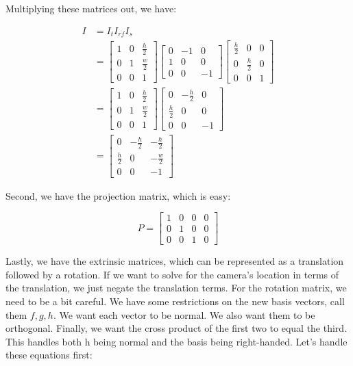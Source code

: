 \documentclass{article}
\begin{document}
Multiplying these matrices out, we have:

\begin{align}
I &= I_t I_{rf} I_s \\
  &= \begin{bmatrix}
1 & 0 & \frac{h}{2} \\
0 & 1 & \frac{w}{2} \\
0 & 0 & 1
\end{bmatrix} \begin{bmatrix}
0 & -1 &  0 \\
1 &  0 &  0 \\
0 &  0 & -1
\end{bmatrix}\begin{bmatrix}
\frac{h}{2} &           0 & 0 \\
0           & \frac{h}{2} & 0 \\
0           &           0 & 1
\end{bmatrix} \\
  &= \begin{bmatrix}
1 & 0 & \frac{h}{2} \\
0 & 1 & \frac{w}{2} \\
0 & 0 & 1
\end{bmatrix} \begin{bmatrix}
0           & -\frac{h}{2} &  0 \\
\frac{h}{2} &            0 &  0 \\
0           &            0 & -1
\end{bmatrix} \\
  &= \begin{bmatrix}
0           & -\frac{h}{2} &  -\frac{h}{2} \\
\frac{h}{2} &            0 &  -\frac{w}{2} \\
0           &            0 &            -1
\end{bmatrix}
\end{align}

Second, we have the projection matrix, which is easy:

$$
P = \begin{bmatrix}
1 & 0 & 0 & 0 \\
0 & 1 & 0 & 0 \\
0 & 0 & 1 & 0
\end{bmatrix}
$$

Lastly, we have the extrinsic matrices, which can be represented as a 
translation followed by a rotation. If we want to solve for the camera's 
location in terms of the translation, we just negate the translation terms. For 
the rotation matrix, we need to be a bit careful. We have some restrictions on 
the new basis vectors, call them $f, g, h$. We want each vector to be 
normal. We also want them to be orthogonal. Finally, we want the cross product 
of the first two to equal the third. This handles both h being normal and the 
basis being right-handed. Let's handle these equations first:
\end{document}
